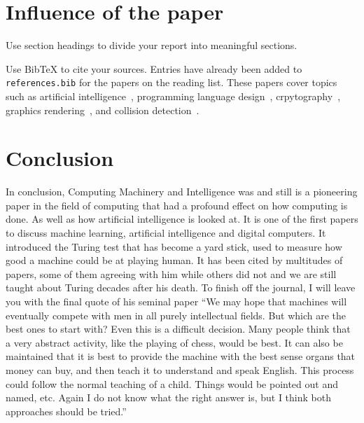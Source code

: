 \documentclass{article}
\begin{document}
\section{Influence of the paper}

Use section headings to divide your report into meaningful sections.

Use BibTeX to cite your sources. Entries have already been added to \texttt{references.bib} for the papers on the reading list.
These papers cover topics such as artificial intelligence~\cite{turing1950_intelligence, knuth1975_alphabeta}, programming language design~\cite{dijkstra1968_goto}, crpytography~\cite{rivest1978_rsa}, graphics rendering~\cite{phong1975_illumination}, and collision detection~\cite{gilbert1988_gjk}.

\section{Conclusion}

In conclusion, Computing Machinery and Intelligence was and still is a pioneering paper in the field of computing that had a 
profound effect on how computing is done. As well as how artificial intelligence is looked at. It is one of the first papers 
to discuss machine learning, artificial intelligence and digital computers. It introduced the Turing test that has become a 
yard stick, used to measure  how good a machine could be at playing human. It has been cited by multitudes of papers, some of 
them agreeing with him while others did not and we are still taught about Turing decades after his death. To finish off the 
journal, I will leave you with the final quote of his seminal paper “We may hope that machines will eventually compete with 
men in all purely intellectual fields. But which are the best ones to start with? Even this is a difficult decision. Many 
people think that a very abstract activity, like the playing of chess, would be best. It can also be maintained that it is 
best to provide the machine with the best sense organs that money can buy, and then teach it to understand and speak English. 
This process could follow the normal teaching of a child. Things would be pointed out and named, etc. Again I do not know what 
the right answer is, but I think both approaches should be tried.”











\end{document}
